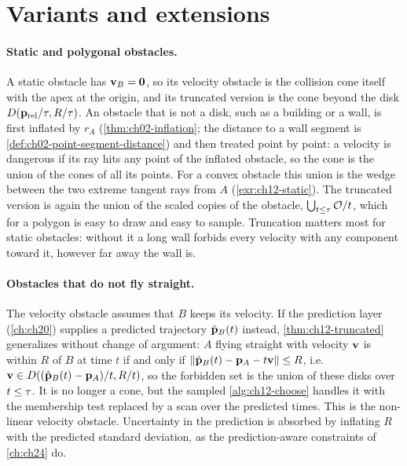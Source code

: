 \section{Variants and extensions}
\label{sec:ch12-variants}

\paragraph{Static and polygonal obstacles.}
A static obstacle has $\mathbf{v}_B = \mathbf{0}$, so its velocity obstacle is the
collision cone itself with the apex at the origin, and its truncated version
is the cone beyond the disk $D(\mathbf{p}_{\mathrm{rel}}/\tau,R/\tau)$. An obstacle
that is not a disk, such as a building or a wall, is first inflated by $r_A$
(\cref{thm:ch02-inflation}; the distance to a wall segment is
\cref{def:ch02-point-segment-distance}) and then treated point by point: a velocity is dangerous if
its ray hits any point of the inflated obstacle, so the cone is the union of
the cones of all its points. For a convex obstacle this union is the wedge
between the two extreme tangent rays from $A$ (\cref{exr:ch12-static}). The
truncated version is again the union of the scaled copies of the obstacle,
$\bigcup_{t \le \tau} \mathcal{O}/t$, which for a polygon is easy to draw and
easy to sample. Truncation matters most for static obstacles: without it a
long wall forbids every velocity with any component toward it, however far
away the wall is.

\paragraph{Obstacles that do not fly straight.}
The velocity obstacle assumes that $B$ keeps its velocity. If the prediction
layer (\cref{ch:ch20}) supplies a predicted trajectory $\hat{\mathbf{p}}_B(t)$
instead, \cref{thm:ch12-truncated} generalizes without change of argument: $A$
flying straight with velocity $\mathbf{v}$ is within $R$ of $B$ at time $t$ if and
only if $\left\lVert \hat{\mathbf{p}}_B(t) - \mathbf{p}_A - t\mathbf{v} \right\rVert \le R$, i.e.\
$\mathbf{v} \in D((\hat{\mathbf{p}}_B(t) - \mathbf{p}_A)/t,R/t)$, so the forbidden set is
the union of these disks over $t \le \tau$. It is no longer a cone, but the
sampled \cref{alg:ch12-choose} handles it with the membership test replaced
by a scan over the predicted times. This is the non-linear velocity obstacle.
Uncertainty in the prediction is absorbed by inflating $R$ with the predicted
standard deviation, as the prediction-aware constraints of \cref{ch:ch24} do.

